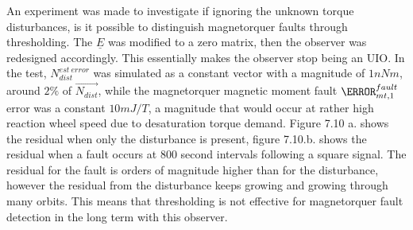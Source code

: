 An experiment was made to investigate if ignoring the unknown torque disturbances, is it possible to distinguish magnetorquer faults through thresholding. The $\underline{E}$ was modified to a zero matrix, then the observer was redesigned accordingly. This essentially makes the observer stop being an UIO. In the test, $N^{est \ error}_{dist}$ was simulated as a constant vector with a magnitude of $1 nNm$, around $2\%$ of $\vec{N_{dist} }$, while the magnetorquer magnetic moment fault $\m^{fault}_{mt,1}$ error was a constant $10 mJ/T$, a magnitude that would occur at rather high reaction wheel speed due to desaturation torque demand. Figure  7.10 a. shows the residual when only the disturbance is present, figure 7.10.b. shows the residual when a fault occurs at 800 second intervals following a square signal. The residual for the fault is orders of magnitude higher than for the disturbance, however the residual from the disturbance keeps growing and growing through many orbits. This means that thresholding is not effective for magnetorquer fault detection in the long term with this observer.




